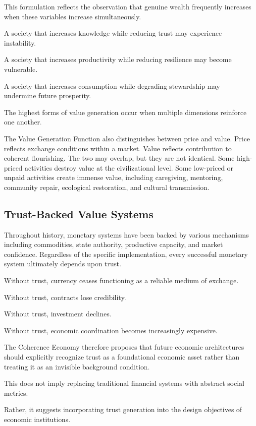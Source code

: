 \documentclass[12pt]{article}
\begin{document}
This formulation reflects the observation that genuine wealth frequently increases when these variables increase simultaneously.

A society that increases knowledge while reducing trust may experience instability.

A society that increases productivity while reducing resilience may become vulnerable.

A society that increases consumption while degrading stewardship may undermine future prosperity.

The highest forms of value generation occur when multiple dimensions reinforce one another.

The Value Generation Function also distinguishes between price and value. Price reflects exchange conditions within a market. Value reflects contribution to coherent flourishing. The two may overlap, but they are not identical. Some high-priced activities destroy value at the civilizational level. Some low-priced or unpaid activities create immense value, including caregiving, mentoring, community repair, ecological restoration, and cultural transmission.

\subsection{Trust-Backed Value Systems}

Throughout history, monetary systems have been backed by various mechanisms including commodities, state authority, productive capacity, and market confidence. Regardless of the specific implementation, every successful monetary system ultimately depends upon trust.

Without trust, currency ceases functioning as a reliable medium of exchange.

Without trust, contracts lose credibility.

Without trust, investment declines.

Without trust, economic coordination becomes increasingly expensive.

The Coherence Economy therefore proposes that future economic architectures should explicitly recognize trust as a foundational economic asset rather than treating it as an invisible background condition.

This does not imply replacing traditional financial systems with abstract social metrics.

Rather, it suggests incorporating trust generation into the design objectives of economic institutions.
\end{document}
